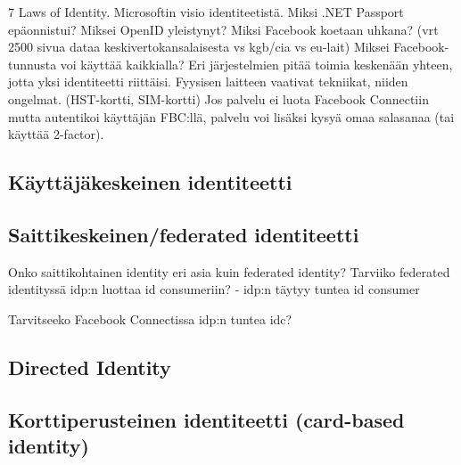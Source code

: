 \documentclass[finnish,gradu]{tktltiki}
\begin{document}
  7 Laws of Identity.
  Microsoftin visio identiteetistä. Miksi .NET Passport epäonnistui?
  Miksei OpenID yleistynyt?
  Miksi Facebook koetaan uhkana? (vrt 2500 sivua dataa keskivertokansalaisesta vs kgb/cia vs eu-lait)
  Miksei Facebook-tunnusta voi käyttää kaikkialla?
  Eri järjestelmien pitää toimia keskenään yhteen, jotta yksi identiteetti riittäisi.
  Fyysisen laitteen vaativat tekniikat, niiden ongelmat. (HST-kortti, SIM-kortti)
  Jos palvelu ei luota Facebook Connectiin mutta autentikoi käyttäjän FBC:llä, palvelu voi lisäksi kysyä omaa salasanaa (tai käyttää 2-factor).

  \subsection{Käyttäjäkeskeinen identiteetti} %
  \label{sub:käyttäjäkeskeinen_identiteetti}


  \subsection{Saittikeskeinen/federated identiteetti} %
  \label{sub:saittikeskeinen_identiteetti}
  Onko saittikohtainen identity eri asia kuin federated identity?
  Tarviiko federated identityssä idp:n luottaa id consumeriin?
  - idp:n täytyy tuntea id consumer

  Tarvitseeko Facebook Connectissa idp:n tuntea idc?



  \subsection{Directed Identity} %
  \label{sub:directed_identity}


  \subsection{Korttiperusteinen identiteetti (card-based identity)} %
  \label{sub:korttiperusteinen_identiteetti_card_based_identity_}
\end{document}
